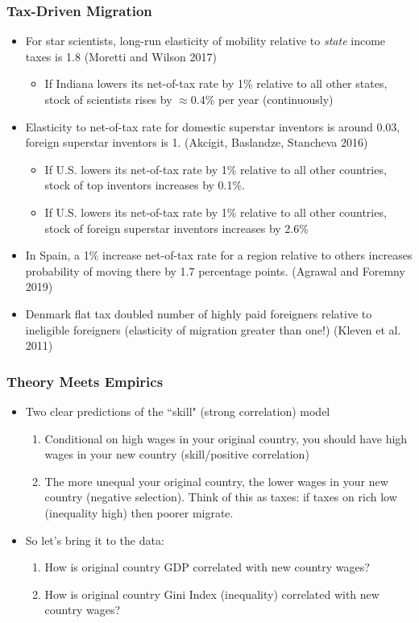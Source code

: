 \documentclass{beamer}
\begin{document}
\begin{frame}
\frametitle{Tax-Driven Migration}
\begin{itemize}
\item For star scientists, long-run elasticity of mobility relative to \emph{state} income taxes is 1.8 (Moretti and Wilson 2017) 
\begin{itemize}
\item If Indiana lowers its net-of-tax rate by 1\% relative to all other states, stock of scientists rises by $\approx$0.4\% per year (continuously)
\end{itemize}
\item Elasticity to net-of-tax rate for domestic superstar inventors is around 0.03, foreign superstar inventors is 1.  (Akcigit, Baslandze, Stancheva 2016)
\begin{itemize}
\item If U.S. lowers its net-of-tax rate by 1\% relative to all other countries, stock of top inventors increases by 0.1\%.
\bigskip
\item If U.S. lowers its net-of-tax rate by 1\% relative to all other countries, stock of foreign superstar inventors increases by 2.6\%
\end{itemize}
\item In Spain, a 1\% increase net-of-tax rate for a region relative to others increases probability of moving there by 1.7 percentage points. (Agrawal and Foremny 2019)
\item Denmark flat tax doubled number of highly paid foreigners relative to ineligible foreigners (elasticity of migration greater than one!) (Kleven et al. 2011) 
\end{itemize}
\end{frame}


\begin{frame}
\frametitle{Theory Meets Empirics}
\begin{itemize}
\item Two clear predictions of the ``skill" (strong correlation) model
\bigskip
\begin{enumerate}
\item Conditional on high wages in your original country, you should have high wages in your new country (skill/positive correlation)
\bigskip
\item The more unequal your original country, the lower wages in your new country (negative selection).  Think of this as taxes: if taxes on rich low (inequality high) then poorer migrate.
\end{enumerate}
\bigskip
\item So let's bring it to the data:
\bigskip
\begin{enumerate}
\item How is original country GDP correlated with new country wages?
\bigskip
\item How is original country Gini Index (inequality) correlated with new country wages?
\end{enumerate}
\end{itemize}
\end{frame}
\end{document}
